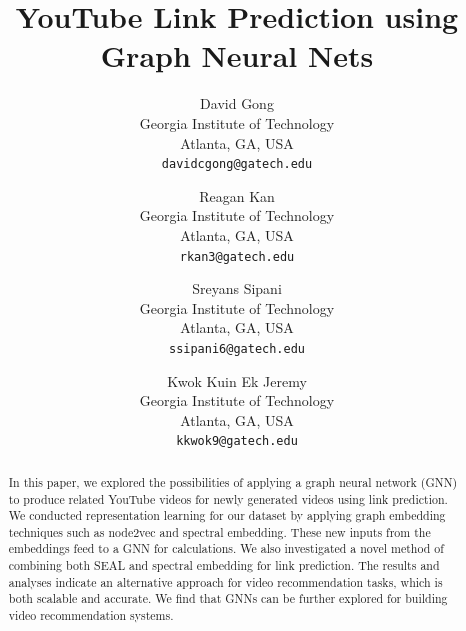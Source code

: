 \documentclass[10pt,twocolumn,letterpaper]{article}
\begin{document}
\title{YouTube Link Prediction using Graph Neural Nets}

\author{David Gong\\
Georgia Institute of Technology\\
Atlanta, GA, USA\\
{\tt\small davidcgong@gatech.edu}
\and
Reagan Kan\\
Georgia Institute of Technology\\
Atlanta, GA, USA\\
{\tt\small rkan3@gatech.edu}
\and
Sreyans Sipani\\
Georgia Institute of Technology\\
Atlanta, GA, USA\\
{\tt\small ssipani6@gatech.edu}
\and
Kwok Kuin Ek Jeremy\\
Georgia Institute of Technology\\
Atlanta, GA, USA\\
{\tt\small kkwok9@gatech.edu}

}

\maketitle

\begin{abstract}
    In this paper, we explored the possibilities of applying a graph neural network (GNN) to produce related YouTube videos for newly generated videos using link prediction. We conducted representation learning for our dataset by applying graph embedding techniques such as node2vec and spectral embedding. These new inputs from the embeddings feed to a GNN for calculations. We also investigated a novel method of combining both SEAL and spectral embedding for link prediction. The results and analyses indicate an alternative approach for video recommendation tasks, which is both scalable and accurate. We find that GNNs can be further explored for building video recommendation systems.
\end{abstract}
\end{document}

